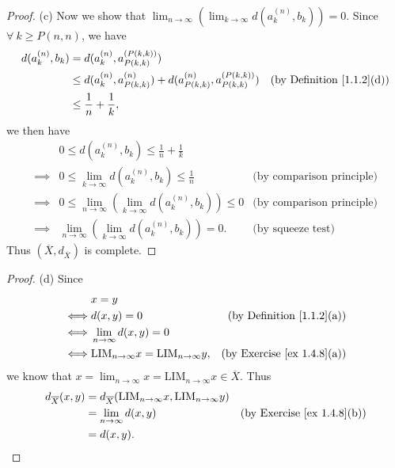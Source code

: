 \begin{proof}{(c)}
    Now we show that \(\lim_{n \to \infty} (\lim_{k \to \infty} d(a_k^{(n)}, b_k)) = 0\).
    Since \(\forall\ k \geq P(n, n)\), we have
    \begin{align*}
        d(a_k^{(n)}, b_k) & = d(a_k^{(n)}, a_{P(k, k)}^{(P(k, k))})                                                                                      \\
                          & \leq d(a_k^{(n)}, a_{P(k, k)}^{(n)}) + d(a_{P(k, k)}^{(n)}, a_{P(k, k)}^{(P(k, k))}) & \text{(by Definition \ref{1.1.2}(d))} \\
                          & \leq \frac{1}{n} + \frac{1}{k},
    \end{align*}
    we then have
    \begin{align*}
                 & 0 \leq d(a_k^{(n)}, b_k) \leq \frac{1}{n} + \frac{1}{k}                                                      \\
        \implies & 0 \leq \lim_{k \to \infty} d(a_k^{(n)}, b_k) \leq \frac{1}{n}             & \text{(by comparison principle)} \\
        \implies & 0 \leq \lim_{n \to \infty} (\lim_{k \to \infty} d(a_k^{(n)}, b_k)) \leq 0 & \text{(by comparison principle)} \\
        \implies & \lim_{n \to \infty} (\lim_{k \to \infty} d(a_k^{(n)}, b_k)) = 0.          & \text{(by squeeze test)}
    \end{align*}
    Thus \((\overline{X}, d_{\overline{X}})\) is complete.
\end{proof}

\begin{proof}{(d)}
    Since
    \begin{align*}
             & x = y                                                                                               \\
        \iff & d(x, y) = 0                                                & \text{(by Definition \ref{1.1.2}(a))}  \\
        \iff & \lim_{n \to \infty} d(x, y) = 0                                                                     \\
        \iff & \text{LIM}_{n \to \infty} x = \text{LIM}_{n \to \infty} y, & \text{(by Exercise \ref{ex 1.4.8}(a))}
    \end{align*}
    we know that \(x = \lim_{n \to \infty} x = \text{LIM}_{n \to \infty} x \in \overline{X}\).
    Thus
    \begin{align*}
        d_{\overline{X}}(x, y) & = d_{\overline{X}}(\text{LIM}_{n \to \infty} x, \text{LIM}_{n \to \infty} y)                                          \\
                               & = \lim_{n \to \infty} d(x, y)                                                & \text{(by Exercise \ref{ex 1.4.8}(b))} \\
                               & = d(x, y).
    \end{align*}
\end{proof}


